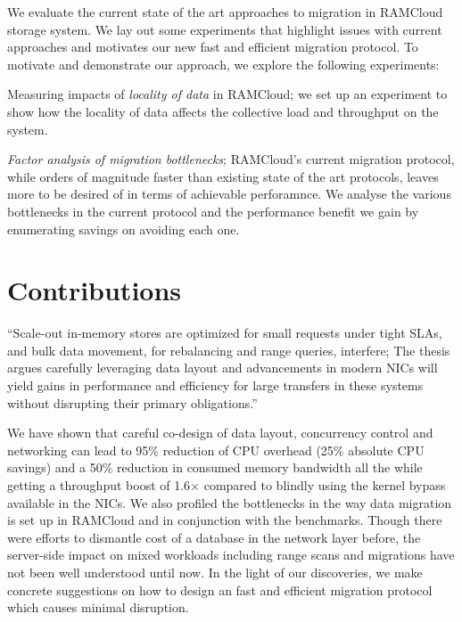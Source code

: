 We evaluate the current state of the art approaches to migration in RAMCloud storage system.
We lay out some experiments that highlight issues with current approaches and motivates our new 
fast and efficient migration protocol. To motivate and demonstrate our approach, we explore
the following experiments:
\begin{myitemize}
\item Measuring impacts of {\em locality of data} in RAMCloud; we set up an experiment to show how 
the locality of data affects the collective load and throughput on the system.
\item {\em Factor analysis of migration bottlenecks}; RAMCloud's current migration protocol, while orders 
of magnitude faster than existing state of the art protocols, leaves more to be desired of in terms of achievable perforamnce.
We analyse the various bottlenecks in the current protocol and the performance benefit we gain by enumerating savings on avoiding 
each one.
\end{myitemize} 

\section{Contributions}
\label{sec:contributions}
``Scale-out in-memory stores are optimized for small requests
under tight SLAs, and bulk data movement, for rebalancing and range queries, interfere;
The thesis argues \linebreak carefully leveraging data layout and advancements in modern NICs
will yield gains in performance and efficiency for large transfers in these systems
without disrupting their primary obligations.''
 
We have shown that careful co-design of data layout, concurrency control
and \linebreak networking can lead to 95\% reduction of CPU overhead (25\% absolute CPU savings) and a 
50\% reduction in consumed memory bandwidth all the while getting a throughput
boost of 1.6$\times$ compared to blindly using the kernel bypass available
in the NICs. We also profiled the bottlenecks in the way data migration is set up
in RAMCloud and in conjunction with the benchmarks. Though there were efforts to 
dismantle cost of a database in the network layer before, the server-side impact
on mixed workloads including range scans and migrations have not been well understood
until now. In the light of our discoveries, we make concrete suggestions on how
 to design an fast and efficient migration protocol which causes minimal disruption.

